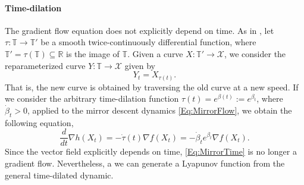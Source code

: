 \documentclass[11pt]{article}
\theoremstyle{plain}
\newcommand{\R}{{\mathbb R}}
\newcommand{\X}{{\mathcal X}}
\begin{document}
\paragraph{Time-dilation} 
The gradient flow equation does not explicitly depend on time. As in \cite{Acceleration}, let  $\tau: \mathbb{T} \rightarrow \mathbb{T}'$ be a smooth twice-continuously differential function, where $\mathbb{T}' = \tau(\mathbb{T}) \subseteq \R$ is the image of $\mathbb{T}$. Given a curve $X:\mathbb{T}' \rightarrow \X$, we consider the reparameterized curve $Y:\mathbb{T} \rightarrow \X$ given by 
\[Y_t = X_{\tau(t)}.\]
 That is,  the new curve is obtained by traversing the old curve at a new speed. If we consider the arbitrary time-dilation function $\tau(t) = e^{\beta(t)}:= e^{\beta_t}$, where $\dot \beta_t >0$, applied to the mirror descent dynamics \eqref{Eq:MirrorFlow}, we obtain the following equation, %
\begin{equation}\label{Eq:MirrorTime}
\frac{d}{dt} \nabla h(X_t) = -\dot \tau(t)\nabla f(X_t) = - \dot \beta_t e^{\beta_t} \nabla f(X_t).
\end{equation}
Since the vector field explicitly depends on time, \eqref{Eq:MirrorTime} is no longer a gradient flow. Nevertheless, a we can generate a Lyapunov function from the general time-dilated dynamic. 
\end{document}

